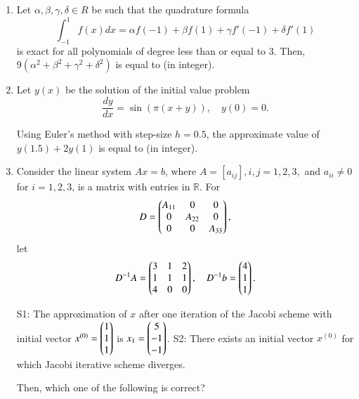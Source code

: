 \documentclass[journal,12pt,onecolumn]{IEEEtran}
\theoremstyle{remark}
\begin{document}
\begin{enumerate}
\hfill{}

\item Let $\alpha,\beta,\gamma,\delta \in R$ be such that the quadrature formula  
\[
\int_{-1}^1 f(x) dx = \alpha f(-1)+\beta f(1)+\gamma f'(-1)+ \delta f'(1)
\]  
is exact for all polynomials of degree less than or equal to 3.  
Then, $9(\alpha^2+\beta^2+\gamma^2+\delta^2)$ is equal to \underline{\hspace{2cm}} (in integer).  

\hfill{}

\item Let $y(x)$ be the solution of the initial value problem  
\[
\frac{dy}{dx} = \sin(\pi(x+y)), \quad y(0)=0.
\]  

Using Euler’s method with step-size $h=0.5$, the approximate value of $y(1.5)+2y(1)$ is equal to \underline{\hspace{2cm}} (in integer).  

\hfill{}




\item Consider the linear system $Ax=b$, where $A=[a_{ij}], i,j=1,2,3,$ and $a_{ii}\neq 0$ for $i=1,2,3$, is a matrix with entries in $\mathbb{R}$.  
For 
$$
D=\begin{pmatrix}A_{11} & 0 & 0 \\ 0 & A_{22} & 0 \\ 0 & 0 & A_{33}\end{pmatrix},
$$  
let  
$$
D^{-1}A = \begin{pmatrix}3 & 1 & 2 \\ 1 & 1 & 1 \\ 4 & 0 & 0\end{pmatrix}, \quad D^{-1}b = \begin{pmatrix}4 \\ 1 \\ 1\end{pmatrix}.
$$  

S1: The approximation of $x$ after one iteration of the Jacobi scheme with initial vector $x^{(0)}=\begin{pmatrix}1 \\ 1 \\ 1\end{pmatrix}$ is $x_1=\begin{pmatrix}5 \\ -1 \\ -1\end{pmatrix}$.  
S2: There exists an initial vector $x^{(0)}$ for which Jacobi iterative scheme diverges.  

Then, which one of the following is correct?  

\begin{enumerate}
\end{enumerate}
\hfill{}


\end{enumerate}
\end{document}

